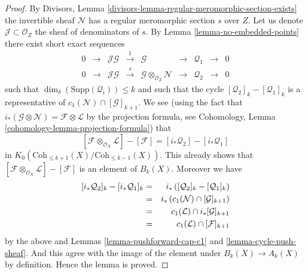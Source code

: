 \begin{proof}
\medskip\noindent
By Divisors, Lemma \ref{divisors-lemma-regular-meromorphic-section-exists}
the invertible sheaf $\mathcal{N}$ has a regular meromorphic section $s$
over $Z$. Let us denote $\mathcal{J} \subset \mathcal{O}_Z$ the sheaf
of denominators of $s$. By Lemma \ref{lemma-no-embedded-points}
there exist short exact sequences
$$
\begin{matrix}
0 &
\to &
\mathcal{J}\mathcal{G} &
\xrightarrow{1} &
\mathcal{G} &
\to &
\mathcal{Q}_1 &
\to &
0 \\
0 &
\to &
\mathcal{J}\mathcal{G} &
\xrightarrow{s} &
\mathcal{G} \otimes_{\mathcal{O}_Z} \mathcal{N} &
\to &
\mathcal{Q}_2 &
\to &
0
\end{matrix}
$$
such that $\dim_\delta(\text{Supp}(\mathcal{Q}_i)) \leq k$ and
such that the cycle
$
[\mathcal{Q}_2]_k - [\mathcal{Q}_1]_k
$
is a representative of $c_1(\mathcal{N}) \cap [\mathcal{G}]_{k + 1}$.
We see (using the fact that
$i_*(\mathcal{G} \otimes \mathcal{N}) = \mathcal{F} \otimes \mathcal{L}$
by the projection formula, see
Cohomology, Lemma \ref{cohomology-lemma-projection-formula})
that
$$
[\mathcal{F} \otimes_{\mathcal{O}_X} \mathcal{L}]
-
[\mathcal{F}]
=
[i_*\mathcal{Q}_2] - [i_*\mathcal{Q}_1]
$$
in $K_0(\text{Coh}_{\leq k + 1}(X)/\text{Coh}_{\leq k - 1}(X))$.
This already shows that
$[\mathcal{F} \otimes_{\mathcal{O}_X} \mathcal{L}] - [\mathcal{F}]$
is an element of $B_k(X)$. Moreover we have
\begin{eqnarray*}
\empty [i_*\mathcal{Q}_2]_k - [i_*\mathcal{Q}_1]_k
& = &
i_*\left( [\mathcal{Q}_2]_k - [\mathcal{Q}_1]_k \right) \\
& = &
i_*\left(c_1(\mathcal{N}) \cap [\mathcal{G}]_{k + 1} \right) \\
& = &
c_1(\mathcal{L}) \cap i_*[\mathcal{G}]_{k + 1} \\
& = &
c_1(\mathcal{L}) \cap [\mathcal{F}]_{k + 1}
\end{eqnarray*}
by the above and Lemmas \ref{lemma-pushforward-cap-c1}
and \ref{lemma-cycle-push-sheaf}. And this agree with the
image of the element under $B_k(X) \to A_k(X)$ by definition.
Hence the lemma is proved.
\end{proof}



















